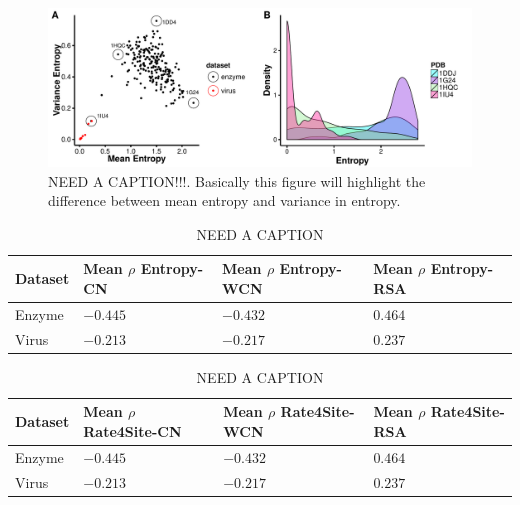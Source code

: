 \documentclass[12pt]{article}
\begin{document}
 
        \begin{figure}[H]
            \centerline{\includegraphics[width=7.5in]{protein_ex_plot.pdf}}     
            \caption{NEED A CAPTION!!!. Basically this figure will highlight the difference between mean entropy and variance in entropy.}
            \label{fig:protein_ex_plot}
    \end{figure}
     

\begin{center}
	\begin{table}[H]
	\begin{tabular}{| p{1.5cm} | p{2.5cm} | p{2cm} | p{2cm} | }
		\hline
		Dataset & Mean $\rho$ Entropy-CN  & Mean $\rho$ Entropy-WCN & Mean $\rho$ Entropy-RSA \\
		\hline	
		Enzyme &  $-0.445$  & $-0.432$ & $0.464$ \\
		\hline
		Virus & $-0.213$ & $-0.217$ & $0.237$ \\
		\hline	
	\end{tabular}
	\caption{NEED A CAPTION}
	\label{table:entropy_stats}
	\end{table}
\end{center}

\begin{center}
	\begin{table}[H]
	\begin{tabular}{| p{1.5cm} | p{2.5cm} | p{2cm} | p{2cm} |  }
		\hline
		Dataset & Mean $\rho$ Rate4Site-CN  & Mean $\rho$ Rate4Site-WCN & Mean $\rho$ Rate4Site-RSA \\
		\hline	
		Enzyme &  $-0.445$  & $-0.432$ & $0.464$ \\
		\hline
		Virus & $-0.213$ & $-0.217$ & $0.237$ \\
		\hline	
	\end{tabular}
	\caption{NEED A CAPTION}
	\label{table:entropy_stats}
	\end{table}
\end{center}
\end{document}
